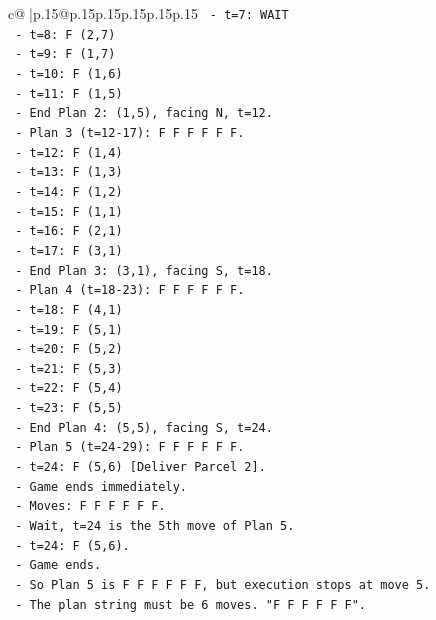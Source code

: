 \documentclass{article}
\begin{document}
{\begin{supertabular}{c@{$\;$}|p{.15\linewidth}@{}p{.15\linewidth}p{.15\linewidth}p{.15\linewidth}p{.15\linewidth}p{.15\linewidth}}
{{{\texttt{         {-} t=7: WAIT} \\
\texttt{         {-} t=8: F (2,7)} \\
\texttt{         {-} t=9: F (1,7)} \\
\texttt{         {-} t=10: F (1,6)} \\
\texttt{         {-} t=11: F (1,5)} \\
\texttt{         {-} End Plan 2: (1,5), facing N, t=12.} \\
\texttt{       {-} Plan 3 (t=12{-}17): F F F F F F.} \\
\texttt{         {-} t=12: F (1,4)} \\
\texttt{         {-} t=13: F (1,3)} \\
\texttt{         {-} t=14: F (1,2)} \\
\texttt{         {-} t=15: F (1,1)} \\
\texttt{         {-} t=16: F (2,1)} \\
\texttt{         {-} t=17: F (3,1)} \\
\texttt{         {-} End Plan 3: (3,1), facing S, t=18.} \\
\texttt{       {-} Plan 4 (t=18{-}23): F F F F F F.} \\
\texttt{         {-} t=18: F (4,1)} \\
\texttt{         {-} t=19: F (5,1)} \\
\texttt{         {-} t=20: F (5,2)} \\
\texttt{         {-} t=21: F (5,3)} \\
\texttt{         {-} t=22: F (5,4)} \\
\texttt{         {-} t=23: F (5,5)} \\
\texttt{         {-} End Plan 4: (5,5), facing S, t=24.} \\
\texttt{       {-} Plan 5 (t=24{-}29): F F F F F F.} \\
\texttt{         {-} t=24: F (5,6) {[}Deliver Parcel 2{]}.} \\
\texttt{         {-} Game ends immediately.} \\
\texttt{         {-} Moves: F F F F F F.} \\
\texttt{         {-} Wait, t=24 is the 5th move of Plan 5.} \\
\texttt{         {-} t=24: F (5,6).} \\
\texttt{         {-} Game ends.} \\
\texttt{         {-} So Plan 5 is F F F F F F, but execution stops at move 5.} \\
\texttt{         {-} The plan string must be 6 moves. "F F F F F F".} \\
}}}
\end{supertabular}}
\end{document}
